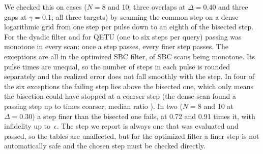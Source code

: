 We checked this on \monoCases{} cases ($N=8$ and 10; three overlaps at $\Delta=0.40$ and three gaps at
$\gamma=0.1$; all three targets) by scanning the common step on a dense logarithmic grid from one step per pulse down
to an eighth of the bisected step. For the dyadic filter and for QETU (one to six steps per query) passing was
monotone in every scan: once a step passes, every finer step passes. The exceptions are all in the optimized SBC
filter, \monoOK{} of \monoN{} SBC scans being monotone. Its pulse times are unequal, so the number of steps in each
pulse is rounded separately and the realized error does not fall smoothly with the step. In four of the six exceptions
the failing step lies above the bisected one, which only means the bisection could have stopped at a coarser step
(the dense scan found a passing step up to \monoRatioHi{} times coarser; median ratio \monoRatioMed). In two
($N=8$ and 10 at $\Delta=0.30$) a step finer than the bisected one fails, at 0.72 and 0.91 times it, with infidelity
up to \monoWorst{}$\,\epsilon$. The step we report is always one that was evaluated and passed, so the tables are
unaffected, but for the optimized filter a finer step is not automatically safe and the chosen step must be checked
directly.
